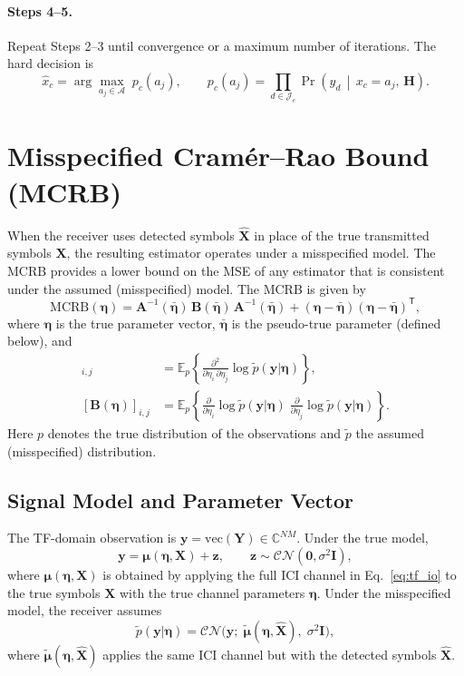 \documentclass[11pt,a4paper]{article}
\newcommand{\CN}{\mathcal{CN}}
\newcommand{\bmmu}{\bm{\mu}}
\newcommand{\bmtildemu}{\bm{\tilde{\mu}}}
\newcommand{\bmeta}{\bm{\eta}}
\newcommand{\bmetabar}{\bm{\bar{\eta}}}
\newcommand{\bmy}{\bm{y}}
\newcommand{\bmY}{\bm{Y}}
\newcommand{\bmX}{\bm{X}}
\newcommand{\bmXhat}{\bm{\hat{X}}}
\begin{document}
\paragraph{Steps 4--5.} Repeat Steps 2--3 until convergence or a
maximum number of iterations. The hard decision is
\begin{equation}
  \hat{x}_c = \arg\max_{a_j\in\mathcal{A}}\;
  p_c(a_j), \qquad
  p_c(a_j) = \prod_{d\in\mathcal{J}_c}
  \Pr\!\left(y_d\,\middle|\,x_c=a_j,\,\mathbf{H}\right).
\end{equation}

\section{Misspecified Cram\'er--Rao Bound (MCRB)}
\label{sec:mcrb}

When the receiver uses detected symbols $\bmXhat$ in place of the true
transmitted symbols $\bmX$, the resulting estimator operates under a
misspecified model. The MCRB provides a lower bound on the MSE of any
estimator that is consistent under the assumed (misspecified)
model. The MCRB is given by
\begin{equation}
  \mathrm{MCRB}(\bmeta) = \bm{A}^{-1}(\bmetabar)\,
  \bm{B}(\bmetabar)\,\bm{A}^{-1}(\bmetabar)
  + (\bmeta - \bmetabar)(\bmeta - \bmetabar)^{\mathsf T},
  \label{eq:mcrb}
\end{equation}
where $\bmeta$ is the true parameter vector, $\bmetabar$ is the
pseudo-true parameter (defined below), and
\begin{align}
  [\bm{A}(\bmeta)]_{i,j} &= \mathbb{E}_{p}\!\left\{
    \frac{\partial^{2}}{\partial\eta_i\,\partial\eta_j}
    \log\tilde{p}(\bmy|\bmeta)\right\},
  \label{eq:A_def}\\[4pt]
  [\bm{B}(\bmeta)]_{i,j} &= \mathbb{E}_{p}\!\left\{
    \frac{\partial}{\partial\eta_i}\log\tilde{p}(\bmy|\bmeta)\;
    \frac{\partial}{\partial\eta_j}\log\tilde{p}(\bmy|\bmeta)\right\}.
  \label{eq:B_def}
\end{align}
Here $p$ denotes the true distribution of the observations and
$\tilde{p}$ the assumed (misspecified) distribution.

\subsection{Signal Model and Parameter Vector}

The TF-domain observation is
$\bmy = \mathrm{vec}(\bmY) \in \mathbb{C}^{NM}$. Under the true
model,
\begin{equation}
  \bmy = \bmmu(\bmeta,\bmX) + \bm{z},
  \qquad \bm{z}\sim\CN(\bm{0},\sigma^2\bm{I}),
\end{equation}
where $\bmmu(\bmeta,\bmX)$ is obtained by applying the full ICI
channel in Eq.~\eqref{eq:tf_io} to the true symbols $\bmX$ with the
true channel parameters $\bmeta$. Under the misspecified model, the
receiver assumes
\begin{equation}
  \tilde{p}(\bmy|\bmeta)
  = \CN\!\bigl(\bmy;\;\bmtildemu(\bmeta,\bmXhat),\;\sigma^2\bm{I}\bigr),
\end{equation}
where $\bmtildemu(\bmeta,\bmXhat)$ applies the same ICI channel but
with the detected symbols $\bmXhat$.
\end{document}
